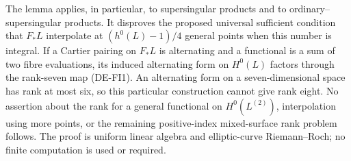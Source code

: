 \begin{remark}
\label{rem:DE-A4-product-Frobenius-interpolation-scope}
The lemma applies, in particular, to supersingular products and
to ordinary--supersingular products. It disproves the proposed
universal sufficient condition that $F_*L$ interpolate at
$(h^0(L)-1)/4$ general points when this number is integral. If a
Cartier pairing on $F_*L$ is alternating and a functional is a
sum of two fibre evaluations, its induced alternating form on
$H^0(L)$ factors through the rank-seven map (DE-FI1). An
alternating form on a seven-dimensional space has rank at most
six, so this particular construction cannot give rank eight.
No assertion about the rank for a general functional on
$H^0(L^{(2)})$, interpolation using more points, or the remaining
positive-index mixed-surface rank problem follows. The proof is
uniform linear algebra and elliptic-curve Riemann--Roch; no finite
computation is used or required.
\end{remark}
